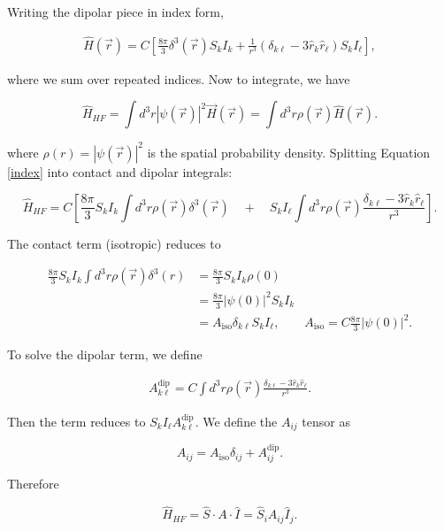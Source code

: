 \documentclass[svgnames]{article}
\begin{document}
Writing the dipolar piece in index form, 

\begin{align} \label{index}
    \hat{H}(\vec{r}) = C \left[ \frac{8\pi}{3} \delta^3(\vec{r}) S_kI_k +
    \frac{1}{r^3} (\delta_{k\ell} - 3 \hat{r}_k\hat{r}_\ell) S_k I_\ell\right],
\end{align} \vspace{3px}

where we sum over repeated indices. Now to integrate, we have

\[
    \hat{H}_{HF} = \int d^3r |\psi(\vec{r})|^2 \vec{H}(\vec{r}) = \int d^3 r
    \rho(\vec{r}) \hat{H}(\vec{r}).
\] \vspace{3px}

where $\rho(r) = |\psi(\vec{r})|^2$ is the spatial probability density.
Splitting Equation \ref{index} into contact and dipolar integrals: 

\[
    \hat{H}_{HF} = C\left[ \frac{8\pi}{3}S_k I_k \int d^3r \rho(\vec{r})
        \delta^3(\vec{r}) \quad +\quad S_k I_\ell \int d^3r \rho(\vec{r})
    \frac{\delta_{k\ell} - 3 \hat{r}_k \hat{r}_\ell}{r^3}\right]. 
\] \vspace{3px}

The contact term (isotropic) reduces to 

\begin{align*}
    \frac{8\pi}{3}S_k I_k \int d^3 r \rho(\vec{r}) \delta^3(r) &=
\frac{8\pi}{3}S_kI_k \rho(0) \\ &= \frac{8\pi}{3}|\psi(0)|^2 S_k I_k \\ 
                                &= A_\text{iso}\delta_{k\ell} S_k I_\ell, \qquad A_\text{iso} =
C\frac{8\pi}{3}|\psi(0)|^2.    
\end{align*} 

To solve the dipolar term, we define 

\begin{align} \label{dipolar_}
    A_{k\ell}^\text{dip} = C\int d^3r \rho(\vec{r}) \frac{\delta_{k\ell} - 3
    \hat{r}_k \hat{r}_\ell}{r^3}. 
\end{align} \vspace{3px}

Then the term reduces to $S_kI_\ell A_{k\ell}^\text{dip}$. We define the
$A_{ij}$ tensor as 

\[
    A_{ij} = A_\text{iso} \delta_{ij} + A_{ij}^\text{dip}.
\] 

Therefore

\vspace{5px}
\begin{bluebox}
    \[ \hat{H}_{HF} = \hat{S} \cdot A \cdot \hat{I} = \hat{S}_i A_{ij} \hat{I}_j.
    \]
\end{bluebox}
\vspace{5px}
\end{document}
